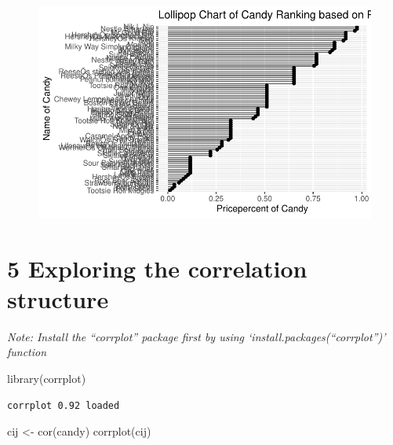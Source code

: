 \documentclass[
  letterpaper,
  DIV=11,
  numbers=noendperiod]{scrartcl}
\newenvironment{Shaded}{\begin{snugshade}}{\end{snugshade}}
\newcommand{\FunctionTok}[1]{\textcolor[rgb]{0.28,0.35,0.67}{#1}}
\newcommand{\NormalTok}[1]{\textcolor[rgb]{0.00,0.23,0.31}{#1}}
\newcommand{\OtherTok}[1]{\textcolor[rgb]{0.00,0.23,0.31}{#1}}
\begin{document}
\begin{figure}[H]

{\centering \includegraphics{class10_files/figure-pdf/unnamed-chunk-25-1.pdf}

}

\end{figure}

\hypertarget{exploring-the-correlation-structure}{%
\section{5 Exploring the correlation
structure}\label{exploring-the-correlation-structure}}

\emph{Note: Install the ``corrplot'' package first by using
`install.packages(``corrplot'')' function}

\begin{Shaded}
\begin{Highlighting}[]
\FunctionTok{library}\NormalTok{(corrplot)}
\end{Highlighting}
\end{Shaded}

\begin{verbatim}
corrplot 0.92 loaded
\end{verbatim}

\begin{Shaded}
\begin{Highlighting}[]
\NormalTok{cij }\OtherTok{\textless{}{-}} \FunctionTok{cor}\NormalTok{(candy)}
\FunctionTok{corrplot}\NormalTok{(cij)}
\end{Highlighting}
\end{Shaded}
\end{document}
